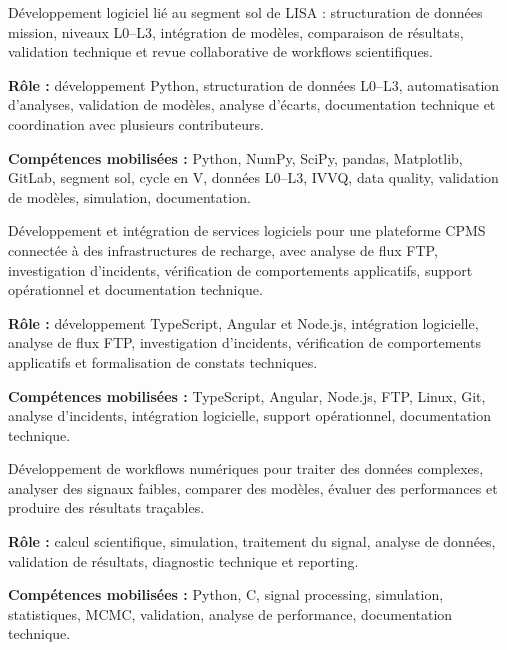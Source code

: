 \documentclass[8pt,a4paper,ragged2e,withhyper]{altacv}
\begin{document}
Développement logiciel lié au segment sol de LISA : structuration de données mission, niveaux L0--L3, intégration de modèles, comparaison de résultats, validation technique et revue collaborative de workflows scientifiques.

\textbf{Rôle :} développement Python, structuration de données L0--L3, automatisation d’analyses, validation de modèles, analyse d’écarts, documentation technique et coordination avec plusieurs contributeurs.

\textbf{Compétences mobilisées :} Python, NumPy, SciPy, pandas, Matplotlib, GitLab, segment sol, cycle en V, données L0--L3, IVVQ, data quality, validation de modèles, simulation, documentation.

\divider


Développement et intégration de services logiciels pour une plateforme CPMS connectée à des infrastructures de recharge, avec analyse de flux FTP, investigation d’incidents, vérification de comportements applicatifs, support opérationnel et documentation technique.

\textbf{Rôle :} développement TypeScript, Angular et Node.js, intégration logicielle, analyse de flux FTP, investigation d’incidents, vérification de comportements applicatifs et formalisation de constats techniques.

\textbf{Compétences mobilisées :} TypeScript, Angular, Node.js, FTP, Linux, Git, analyse d’incidents, intégration logicielle, support opérationnel, documentation technique.

\divider


Développement de workflows numériques pour traiter des données complexes, analyser des signaux faibles, comparer des modèles, évaluer des performances et produire des résultats traçables.

\textbf{Rôle :} calcul scientifique, simulation, traitement du signal, analyse de données, validation de résultats, diagnostic technique et reporting.

\textbf{Compétences mobilisées :} Python, C, signal processing, simulation, statistiques, MCMC, validation, analyse de performance, documentation technique.
\end{document}
